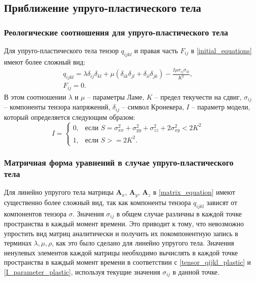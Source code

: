 \clearpage
\newpage

\subsection{Приближение упруго-пластического тела}

\subsubsection{Реологические соотношения для упруго-пластического тела}

Для упруго-пластического тела тензор $q_{ijkl}$ и правая часть $F_{ij}$ в \ref{initial_equations} имеют более сложный вид:
\begin{eqnarray}
\label{tensor_qijkl_plastic}
q_{ijkl}=\lambda\delta_{ij}\delta_{kl}+\mu(\delta_{ik}\delta_{jl}+\delta_{il}\delta_{jk})-\frac{I\mu\sigma_{ij}\sigma_{kl}}{K^2},
\nonumber\\
F_{ij}=0.
\end{eqnarray}
В этом соотношении $\lambda$ и $\mu$ -- параметры Ламе, $K$ -- предел текучести на сдвиг, $\sigma_{ij}$ -- компоненты тензора напряжений, $\delta_{ij}$ -- символ Кронекера, $I$ -- параметр модели, который определяется следующим образом:
\begin{equation}
\label{I_parameter_plastic}
I=\begin{cases}
0, & \text{если $S = \sigma_{xx}^2+\sigma_{yy}^2+\sigma_{zz}^2+2\sigma_{xy}^2 < 2K^2$}\\
1, & \text{если $S >= 2K^2$}.
\end{cases}
\end{equation}

\subsubsection{Матричная форма уравнений в случае упруго-пластического тела}

Для линейно упругого тела матрицы $\mathbf{A}_x$, $\mathbf{A}_y$, $\mathbf{A}_z$ в \ref{matrix_equation} имеют существенно более сложный вид, так как компоненты тензора $q_{ijkl}$ зависят от компонентов тензора $\sigma$. Значения $\sigma_{ij}$ в общем случае различны в каждой точке пространства в каждый момент времени. Это приводит к тому, что невозможно упростить вид матриц аналитически и получить их покомпонентную запись в терминах $\lambda, \mu, \rho$, как это было сделано для линейно упругого тела. Значения ненулевых элементов каждой матрицы необходимо вычислять в каждой точке пространства в каждый момент времени в соответствии с \ref{tensor_qijkl_plastic} и \ref{I_parameter_plastic}, используя текущие значения $\sigma_{ij}$ в данной точке.

